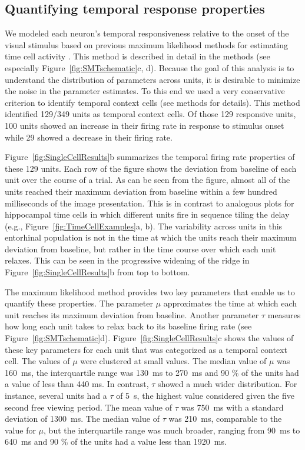 \documentclass{apa}
\begin{document}
\subsection{Quantifying temporal response properties}
We modeled each neuron's temporal
responsiveness relative to the onset of the visual stimulus based on previous
maximum likelihood methods for estimating time cell activity
\cite{TigaEtal17}.  This method is described in detail in the methods (see
especially Figure~\ref{fig:SMTschematic}c, d).
Because the goal of this analysis is to understand the distribution of
parameters across units, it is desirable to minimize the noise in the
parameter estimates.  To this end we used a very conservative criterion to
identify temporal context cells (see methods for details). 
This method identified 129/349 units as temporal context cells.
Of those 129 responsive units, 100 units showed an increase in their firing rate in response to
stimulus onset while 29 showed a decrease in their firing rate.

Figure~\ref{fig:SingleCellResults}b summarizes the temporal firing rate
properties of these 129 units.  Each row of the figure shows the deviation from
baseline of each unit over the course of a trial. %
As can be seen from the figure, almost
all of the units reached their maximum deviation from baseline within a few
hundred milliseconds of the image presentation.  This is in contrast to
analogous plots for hippocampal time cells in which different units fire in
sequence tiling the delay (e.g., Figure~\ref{fig:TimeCellExamples}a, b).  The
variability across units in this entorhinal population is not in the time at
which the units reach their maximum deviation from baseline, but rather in the time
course over which each unit relaxes.  This can be seen in the progressive
widening of the ridge in Figure~\ref{fig:SingleCellResults}b from top to
bottom.  

The maximum likelihood method provides two key parameters that enable us to
quantify these properties.  The parameter $\mu$ approximates the time at which
each unit reaches its maximum deviation from baseline.  Another parameter
$\tau$ measures how long each unit takes to relax back to its baseline firing
rate (see Figure~\ref{fig:SMTschematic}d).
Figure~\ref{fig:SingleCellResults}c shows the values of these key
parameters for each unit that was categorized as a temporal context cell.  
The values of $\mu$ were clustered at small values.
The median value of $\mu$ was 160~ms, the interquartile range was 130~ms to
270~ms and 90 \% of the units had a value of less than 440 ms.
In contrast, $\tau$ showed a much wider distribution.  For
instance, several units had a $\tau$ of 5~s, the highest value 
considered given the five second free viewing period. 
The mean value of $\tau$ was 
750~ms with a standard deviation of 1300~ms.
The median value of $\tau$ was 210~ms, comparable to the value for $\mu$, but
the interquartile range was much broader, ranging from 90~ms to 640~ms and 90 \% 
of the units had a value less than 1920~ms.  
\end{document}
